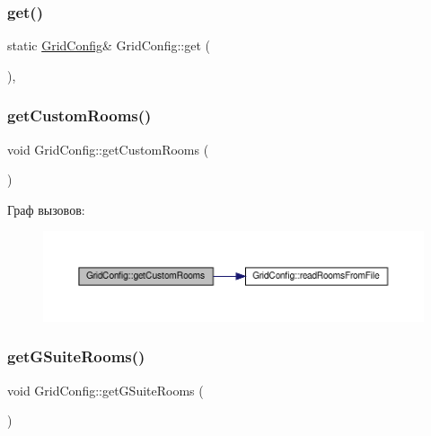 \subsubsection{\texorpdfstring{get()}{get()}}
{\footnotesize\ttfamily static \hyperlink{class_grid_config}{Grid\+Config}\& Grid\+Config\+::get (\begin{DoxyParamCaption}{ }\end{DoxyParamCaption})\hspace{0.3cm}{\ttfamily [inline]}, {\ttfamily [static]}}

\mbox{\label{class_grid_config_a33834786b69a7473552cfb025937c253}} 
\subsubsection{\texorpdfstring{get\+Custom\+Rooms()}{getCustomRooms()}}
{\footnotesize\ttfamily void Grid\+Config\+::get\+Custom\+Rooms (\begin{DoxyParamCaption}{ }\end{DoxyParamCaption})\hspace{0.3cm}{\ttfamily [private]}}

Граф вызовов\+:\nopagebreak
\begin{figure}[H]
\begin{center}
\leavevmode
\includegraphics[width=350pt]{class_grid_config_a33834786b69a7473552cfb025937c253_cgraph}
\end{center}
\end{figure}
\mbox{\label{class_grid_config_af0f79f5721c69162bebeeac5e3bdcf03}} 
\subsubsection{\texorpdfstring{get\+G\+Suite\+Rooms()}{getGSuiteRooms()}}
{\footnotesize\ttfamily void Grid\+Config\+::get\+G\+Suite\+Rooms (\begin{DoxyParamCaption}{ }\end{DoxyParamCaption})\hspace{0.3cm}{\ttfamily [private]}}

